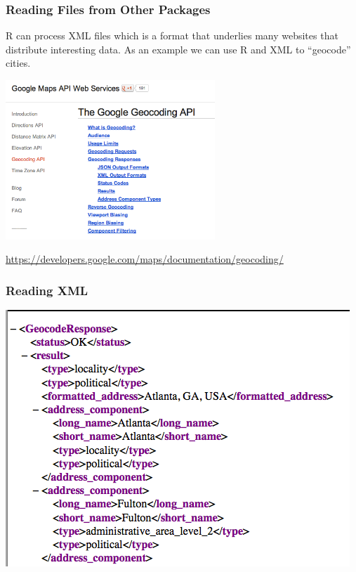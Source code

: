 \documentclass{beamer}
\begin{document}
\begin{frame}[fragile]
\frametitle{Reading Files from Other Packages}
R can process XML files which is a format that underlies many websites that distribute interesting data. As an example we can use R and XML to ``geocode'' cities. 
\footnotesize
\begin{center}
\includegraphics[height=6cm]{../IMG/geocode.png}
\end{center}
\scriptsize
\url{https://developers.google.com/maps/documentation/geocoding/}
\end{frame}

\begin{frame}[fragile]
\frametitle{Reading XML}
\begin{center} 
\includegraphics{../IMG/xml.png}
\end{center}
\end{frame}
\end{document}
